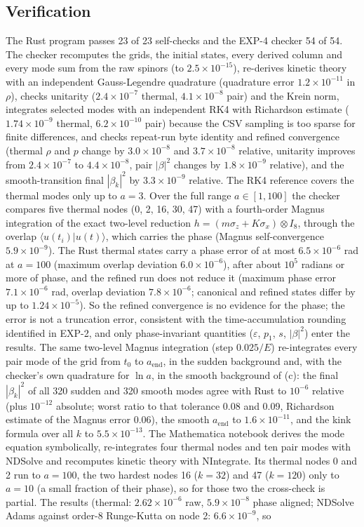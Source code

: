 \documentclass[11pt]{article}
\begin{document}
\subsection{Verification}

The Rust program passes 23 of 23 self-checks and the EXP-4 checker 54 of 54. The checker recomputes the grids, the initial states, every derived column and every mode sum from the raw spinors (to $2.5\times10^{-15}$), re-derives kinetic theory with an independent Gauss-Legendre quadrature (quadrature error $1.2\times10^{-11}$ in $\rho$), checks unitarity ($2.4\times10^{-7}$ thermal, $4.1\times10^{-8}$ pair) and the Krein norm, integrates selected modes with an independent RK4 with Richardson estimate ($1.74\times10^{-9}$ thermal, $6.2\times10^{-10}$ pair) because the CSV sampling is too sparse for finite differences, and checks repeat-run byte identity and refined convergence (thermal $\rho$ and $p$ change by $3.0\times10^{-8}$ and $3.7\times10^{-8}$ relative, unitarity improves from $2.4\times10^{-7}$ to $4.4\times10^{-8}$, pair $|\beta|^2$ changes by $1.8\times10^{-9}$ relative), and the smooth-transition final $|\beta_k|^2$ by $3.3\times10^{-9}$ relative. The RK4 reference covers the thermal modes only up to $a=3$. Over the full range $a\in[1,100]$ the checker compares five thermal nodes (0, 2, 16, 30, 47) with a fourth-order Magnus integration of the exact two-level reduction $h=(m\sigma_z+K\sigma_x)\otimes I_8$, through the overlap $\langle u(t_i)|u(t)\rangle$, which carries the phase (Magnus self-convergence $5.9\times10^{-9}$). The Rust thermal states carry a phase error of at most $6.5\times10^{-6}$ rad at $a=100$ (maximum overlap deviation $6.0\times10^{-6}$), after about $10^5$ radians or more of phase, and the refined run does not reduce it (maximum phase error $7.1\times10^{-6}$ rad, overlap deviation $7.8\times10^{-6}$; canonical and refined states differ by up to $1.24\times10^{-5}$). So the refined convergence is no evidence for the phase; the error is not a truncation error, consistent with the time-accumulation rounding identified in EXP-2, and only phase-invariant quantities ($\varepsilon$, $p_1$, $s$, $|\beta|^2$) enter the results. The same two-level Magnus integration (step $0.025/E$) re-integrates every pair mode of the grid from $t_0$ to $a_{\mathrm{end}}$, in the sudden background and, with the checker's own quadrature for $\ln a$, in the smooth background of (c): the final $|\beta_k|^2$ of all 320 sudden and 320 smooth modes agree with Rust to $10^{-6}$ relative (plus $10^{-12}$ absolute; worst ratio to that tolerance 0.08 and 0.09, Richardson estimate of the Magnus error 0.06), the smooth $a_{\mathrm{end}}$ to $1.6\times10^{-11}$, and the kink formula over all $k$ to $5.5\times10^{-13}$. The Mathematica notebook derives the mode equation symbolically, re-integrates four thermal nodes and ten pair modes with NDSolve and recomputes kinetic theory with NIntegrate. Its thermal nodes 0 and 2 run to $a=100$, the two hardest nodes 16 ($k=32$) and 47 ($k=120$) only to $a=10$ (a small fraction of their phase), so for those two the cross-check is partial. The results (thermal: $2.62\times10^{-6}$ raw, $5.9\times10^{-8}$ phase aligned; NDSolve Adams against order-8 Runge-Kutta on node 2: $6.6\times10^{-9}$, so 
\end{document}
